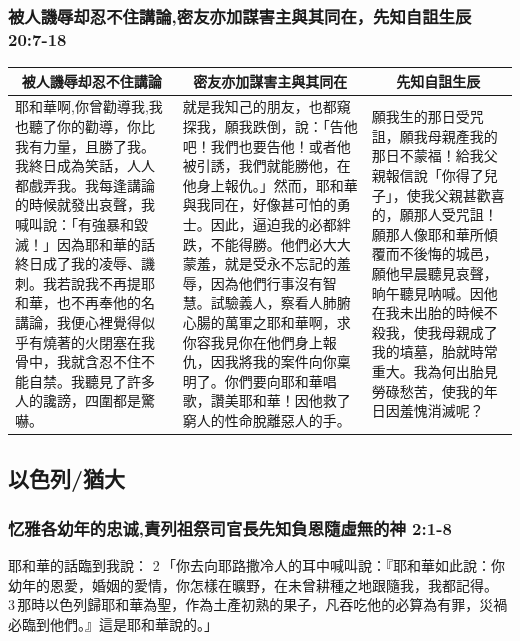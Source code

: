 \subsubsection{被人譏辱却忍不住講論,密友亦加謀害主與其同在，先知自詛生辰 20:7-18}
\begin{table}[H]
\centering
\begin{tabular}{p{5.25cm}|p{6.75cm}|p{4.75cm}}\hline\hline
\multicolumn{1}{c|}{被人譏辱却忍不住講論}&\multicolumn{1}{c|}{密友亦加謀害主與其同在}&\multicolumn{1}{c}{先知自詛生辰}\\\hline
耶和華啊,你曾勸導我,我也聽了你的勸導，你比我有力量，且勝了我。我終日成為笑話，人人都戲弄我。我每逢講論的時候就發出哀聲，我喊叫說：「有強暴和毀滅！」因為耶和華的話終日成了我的凌辱、譏刺。我若說我不再提耶和華，也不再奉他的名講論，我便心裡覺得似乎有燒著的火閉塞在我骨中，我就含忍不住不能自禁。我聽見了許多人的讒謗，四圍都是驚嚇。
&就是我知己的朋友，也都窺探我，願我跌倒，說：「告他吧！我們也要告他！或者他被引誘，我們就能勝他，在他身上報仇。」然而，耶和華與我同在，好像甚可怕的勇士。因此，逼迫我的必都絆跌，不能得勝。他們必大大蒙羞，就是受永不忘記的羞辱，因為他們行事沒有智慧。試驗義人，察看人肺腑心腸的萬軍之耶和華啊，求你容我見你在他們身上報仇，因我將我的案件向你稟明了。你們要向耶和華唱歌，讚美耶和華！因他救了窮人的性命脫離惡人的手。
&願我生的那日受咒詛，願我母親產我的那日不蒙福！給我父親報信說「你得了兒子」，使我父親甚歡喜的，願那人受咒詛！願那人像耶和華所傾覆而不後悔的城邑，願他早晨聽見哀聲，晌午聽見呐喊。因他在我未出胎的時候不殺我，使我母親成了我的墳墓，胎就時常重大。我為何出胎見勞碌愁苦，使我的年日因羞愧消滅呢？\\\hline
\end{tabular}
\end{table}

\subsection{以色列/猶大}



\subsubsection{忆雅各幼年的忠诚,責列祖祭司官長先知負恩隨虛無的神 2:1-8}
耶和華的話臨到我說： 2 「你去向耶路撒冷人的耳中喊叫說：『耶和華如此說：你幼年的恩愛，婚姻的愛情，你怎樣在曠野，在未曾耕種之地跟隨我，我都記得。 3 那時以色列歸耶和華為聖，作為土產初熟的果子，凡吞吃他的必算為有罪，災禍必臨到他們。』這是耶和華說的。」

